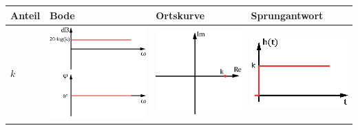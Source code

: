 \begin{tabular}{>{\centering\arraybackslash}p{1.5cm}|>{\centering\arraybackslash}p{2.5cm}|>{\centering\arraybackslash}p{2cm}|>{\centering\arraybackslash}p{2.5cm}}
	   \rule[-2ex]{0pt}{5.5ex} Anteil  & Bode  & Ortskurve  & Sprungantwort  \\ 
\hline \rule[-2ex]{0pt}{5.5ex} $k$  & \includegraphics[scale = 0.3]{images/bode_k.eps} & \includegraphics[scale = 0.4]{images/ort_k.eps} & \includegraphics[scale = 0.5]{images/spr_k.eps} \\ 

\end{tabular}
